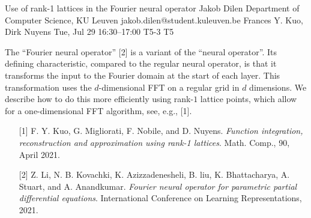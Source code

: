 \begin{talk}
\end{talk}

\begin{talk}
  {Use of rank-1 lattices in the Fourier neural operator}%
  {Jakob Dilen}%
  {Department of Computer Science, KU Leuven}%
  {jakob.dilen@student.kuleuven.be}%
  {Frances Y. Kuo, Dirk Nuyens}%
  {}%
  {Tue, Jul 29 16:30–17:00}%
  {T5-3}%
  {T5}%
  
				

The ``Fourier neural operator'' [2] is a variant of the ``neural operator''.
Its defining characteristic, compared to the regular neural operator, is that it transforms the input to the Fourier domain at the start of each layer. This transformation uses the $d$-dimensional FFT on a regular grid in $d$ dimensions. We describe how to do this more efficiently using rank-$1$ lattice points, which allow for a one-dimensional FFT algorithm, see, e.g., [1]. 

\medskip
\begin{enumerate}
        \item[{[1]}] F. Y. Kuo, G. Migliorati, F. Nobile, and D. Nuyens. \textit{Function integration,
reconstruction and approximation using rank-1 lattices}. Math. Comp., 90, April
2021.   
        \item[{[2]}] Z. Li, N. B. Kovachki, K. Azizzadenesheli, B. liu, K. Bhattacharya, A. Stuart,
and A. Anandkumar. \textit{Fourier neural operator for parametric partial differential
equations}. International Conference on Learning Representations, 2021.
\end{enumerate}
\end{talk}

